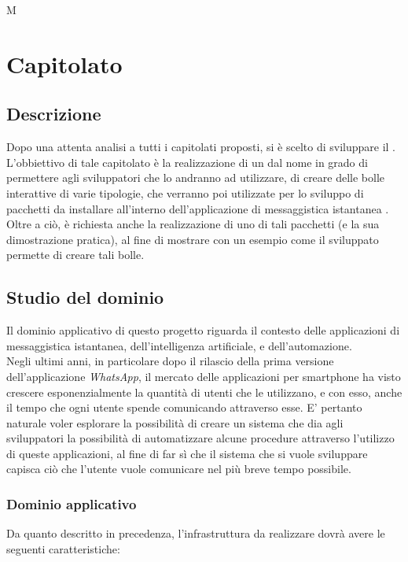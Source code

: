 M\section{Capitolato \capitolato}
\subsection{Descrizione}
Dopo una attenta analisi a tutti i capitolati proposti, si è scelto di sviluppare il  \capitolato. \\
L'obbiettivo di tale capitolato è la realizzazione di un  dal nome \progetto in grado di permettere agli sviluppatori che lo andranno ad utilizzare, di creare delle bolle interattive di varie tipologie, che verranno poi utilizzate per lo sviluppo di pacchetti da installare all'interno dell'applicazione di messaggistica istantanea . Oltre a ciò, è richiesta anche la realizzazione di uno di tali pacchetti (e la sua dimostrazione pratica), al fine di mostrare con un esempio come il  sviluppato permette di creare tali bolle.

\subsection{Studio del dominio}
Il dominio applicativo di questo progetto riguarda il contesto delle applicazioni di messaggistica istantanea, dell'intelligenza artificiale, e dell'automazione. \\
Negli ultimi anni, in particolare dopo il rilascio della prima versione dell'applicazione \textit{WhatsApp}, il mercato delle applicazioni per smartphone ha visto crescere esponenzialmente la quantità di utenti che le utilizzano, e con esso, anche il tempo che ogni utente spende comunicando attraverso esse. E' pertanto naturale voler esplorare la possibilità di creare un sistema che dia agli sviluppatori la possibilità di automatizzare alcune procedure attraverso l'utilizzo di queste applicazioni, al fine di far sì che il sistema che si vuole sviluppare capisca ciò che l'utente vuole comunicare nel più breve tempo possibile.

\subsubsection{Dominio applicativo}
Da quanto descritto in precedenza, l'infrastruttura da realizzare dovrà avere le seguenti caratteristiche:

